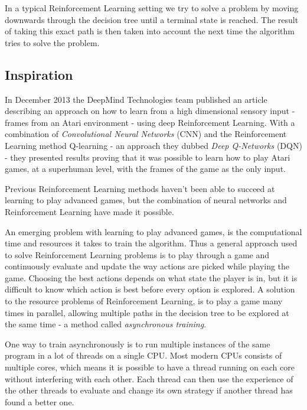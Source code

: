 \documentclass[11pt]{article}
\begin{document}
In a typical Reinforcement Learning setting we try to solve a problem
by moving downwards through the decision tree until a terminal state is reached.
The result of taking this exact path is then
taken into account the next time the algorithm tries to solve the problem.

\subsection{Inspiration}

In December 2013 the DeepMind Technologies team published an article
describing an approach on how to learn from a high dimensional sensory input -
frames from an Atari environment -
using deep Reinforcement Learning\cite{dqn}.
With a combination of \textit{Convolutional Neural Networks} (CNN) and
the Reinforcement Learning method Q-learning\cite{RLbook} - an approach they
dubbed \textit{Deep Q-Networks} (DQN) - they
presented results proving that it was possible to learn how to play Atari
games, at a superhuman level, with the frames of the game as the only input.

Previous Reinforcement Learning methods haven't been able to succeed at learning to play
advanced games, but the combination of neural networks and
Reinforcement Learning have made it possible.

An emerging problem with learning to play advanced games, is the computational time and
resources it takes to train the algorithm.
Thus a general approach used to solve Reinforcement Learning problems is to
play through a game and continuously evaluate and update the way actions are picked
while playing the game.
Choosing the best actions depends on what state the player is in, but it is difficult to
know which action is best before every option is explored.
A solution to the resource problems of Reinforcement Learning,
is to play a game many times in parallel,
allowing multiple paths in the decision tree to be explored at the same time -
a method called \textit{asynchronous training}.


One way to train asynchronously is to run multiple instances of the same program
in a lot of threads on a single CPU.
Most modern CPUs consists of multiple cores, which means it is possible to have a thread
running on each core without interfering with each other.
Each thread can then use the experience of the other threads 
to evaluate and change its own strategy if another thread
has found a better one.
\end{document}
